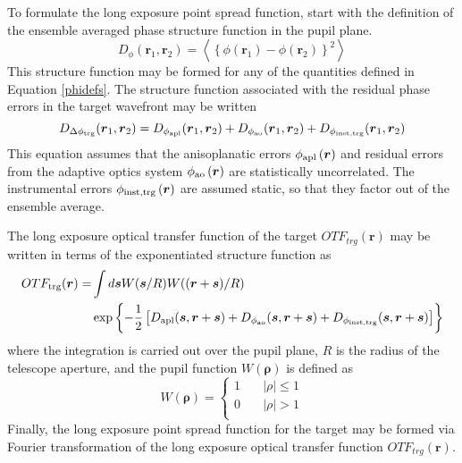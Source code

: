 To formulate the long exposure point spread function, start with the
definition of the ensemble averaged phase structure function in the
pupil plane.
\begin{equation}
\label{strfn_def}
D_{\phi}(\boldsymbol{r}_{1},\boldsymbol{r}_{2})  = 
\left\langle \left\{\phi\left(\boldsymbol{r}_{1}\right) - 
\phi\left(\boldsymbol{r}_{2}\right)\right\}^{2}\right\rangle
\end{equation}
This structure function may be formed for any of the quantities
defined in Equation \ref{phidefs}.  The structure function associated
with the residual phase errors in the target wavefront may be written
\begin{equation}\label{lgsstrfn}
D_{\Delta\phi_{\rm trg}}(\boldsymbol{r}_{1},\boldsymbol{r}_{2}) = 
D_{\phi_{\rm apl}}(\boldsymbol{r}_{1},\boldsymbol{r}_{2}) 
+ D_{\phi_{\rm ao}}(\boldsymbol{r}_{1},\boldsymbol{r}_{2}) 
+ D_{\phi_{\rm inst,trg}}(\boldsymbol{r}_{1},\boldsymbol{r}_{2}) 
\end{equation}
This equation assumes that the anisoplanatic errors $\phi_{\rm
  apl}\left(\boldsymbol{r}\right)$ and residual errors from the
adaptive optics system $\phi_{\rm ao}\left(\boldsymbol{r}\right)$ are
statistically uncorrelated.  The instrumental errors $\phi_{\rm
  inst,trg}\left(\boldsymbol{r}\right)$ are assumed static, so that they
factor out of the ensemble average.

The long exposure optical transfer function of the target
$OTF_{trg}(\boldsymbol{r})$ may be written in terms of the
exponentiated structure function as
\begin{equation}\label{lgsotf}
\begin{aligned}
OTF_{\rm trg}(\boldsymbol{r}) = & \int d\boldsymbol{s} W(\boldsymbol{s}/R)W((\boldsymbol{r}+\boldsymbol{s})/R) \\
&
\exp{\left\{-{1 \over 2}\left[
D_{\rm apl}(\boldsymbol{s},\boldsymbol{r} + \boldsymbol{s}) + 
D_{\rm \phi_{ao}}(\boldsymbol{s},\boldsymbol{r} + \boldsymbol{s})+ 
D_{\rm \phi_{inst,trg}}(\boldsymbol{s},\boldsymbol{r} + \boldsymbol{s})\right]\right\}}
\end{aligned}
\end{equation}
where the integration is carried out over the pupil plane, $R$ is the
radius of the telescope aperture, and the pupil function
$W\left(\boldsymbol{\rho}\right)$ is defined as
\begin{equation}\label{pupileqn}
W\left(\boldsymbol{\rho}\right) = 
\left\{
\begin{aligned}
1 & \quad \left\vert \rho \right\vert \le 1 \\
0 & \quad \left\vert \rho \right\vert > 1 \\
\end{aligned}
\right.
\end{equation}
Finally, the long exposure point spread function for the target may be
formed via Fourier transformation of the long exposure optical
transfer function $OTF_{trg}(\boldsymbol{r})$.


